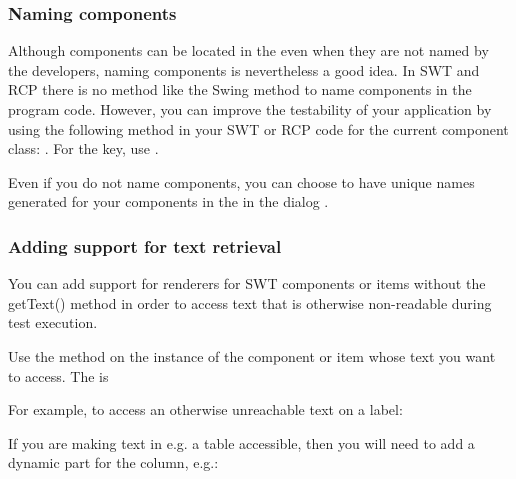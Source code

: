 
\subsubsection{Naming components}
Although  components  can be located in the \gdaut{} even when they are not named by the developers, naming components is nevertheless a good idea. In SWT and RCP there is no method like the Swing  method to name components in the program code. However, you can improve the testability of your application by using the following method in your SWT or RCP code for the current component class: . For the key, use . 

Even if you do not name components, you can choose to have unique names generated for your components in the \gdaut{} in the \gdaut{} dialog . 

\subsubsection{Adding support for text retrieval}

You can add support for renderers for SWT components or items  without the getText() method in order to access text that is otherwise non-readable during test execution. 

Use the method  on the instance of the component or item whose text you want to access. The  is 

For example, to access an otherwise unreachable text on a label:\\

If you are making text in e.g. a table accessible, then you will need to add a dynamic part for the column, e.g.:\\

